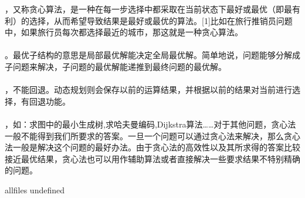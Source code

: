 \documentclass{article}
\begin{document}
\begin{CJK}{UTF8}{gbsn}     %

\else
    
，又称贪心算法，是一种在每一步选择中都采取在当前状态下最好或最优（即最有利）的选择，从而希望导致结果是最好或最优的算法。[1]比如在旅行推销员问题中，如果旅行员每次都选择最近的城市，那这就是一种贪心算法。\\
\\
。最优子结构的意思是局部最优解能决定全局最优解。简单地说，问题能够分解成子问题来解决，子问题的最优解能递推到最终问题的最优解。\\
\\
，不能回退。动态规划则会保存以前的运算结果，并根据以前的结果对当前进行选择，有回退功能。\\
\\
，如：求图中的最小生成树,求哈夫曼编码,Dijkstra算法……对于其他问题，贪心法一般不能得到我们所要求的答案。一旦一个问题可以通过贪心法来解决，那么贪心法一般是解决这个问题的最好办法。由于贪心法的高效性以及其所求得的答案比较接近最优结果，贪心法也可以用作辅助算法或者直接解决一些要求结果不特别精确的问题。

\fi

\ifx allfiles undefined
\end{CJK}
\end{document}
